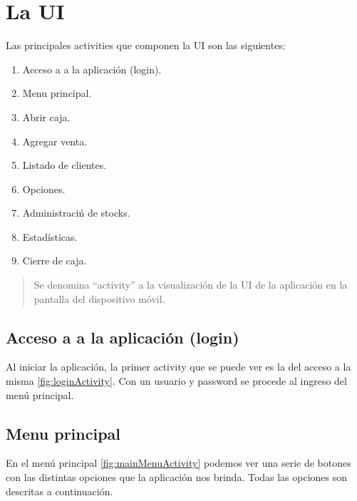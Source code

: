 \chapter{La \acf{UI}}
\label{sec:ui}

Las principales activities que componen la \ac{UI} son las siguientes:

\begin{enumerate}
\item Acceso a a la aplicaci\'on (login).
\item Menu principal. 
\item Abrir caja.
\item Agregar venta.
\item Listado de clientes.
\item Opciones.
\item Administraci\'n de stocks.
\item Estad\'isticas.
\item Cierre de caja.
\end{enumerate}

\begin{quote}
Se denomina ``activity'' a la visualizaci\'on de la \ac{UI} de la aplicaci\'on en la pantalla del dispositivo m\'ovil.
\end{quote}



\section{Acceso a a la aplicaci\'on (login)}
\label{sec:ui.login}

Al iniciar la aplicaci\'on, la primer activity que se puede ver es la del acceso a la misma \ref{fig:loginActivity}. Con un usuario y password se procede al ingreso del men\'u principal.


\section{Menu principal}
\label{sec:ui.mainmenu}

En el men\'u principal \ref{fig:mainMenuActivity} podemos ver una serie de botones con las distintas opciones que la aplicaci\'on nos brinda. Todas las opciones son descritas a continuaci\'on.

